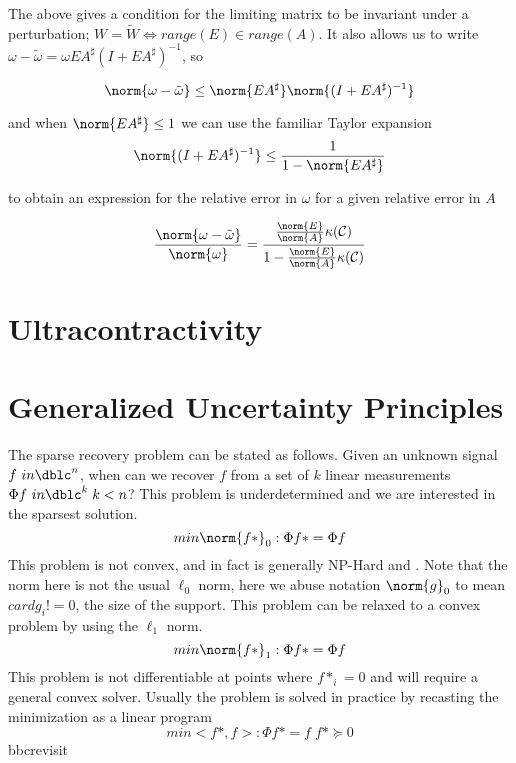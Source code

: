 The above gives a condition for the limiting matrix to be invariant under a perturbation;  $W=\tilde{W} \iff range(E) \in range(A)$.  It also allows us to write $\omega - \tilde{\omega} = \omega E A^\sharp (I+ E A^\sharp)^{-1}$, so

\begin{equation*}
\norm{\omega - \tilde{\omega}} \leq \norm{E A^\sharp} \norm{ (I+E A^\sharp)^{-1}}
\end{equation*}

and when $\norm{E A^\sharp} \leq 1$ we can use the familiar Taylor expansion
\begin{equation*}
\norm{(I+E A^\sharp)^{-1}} \leq \frac{1}{ 1 - \norm{E A^\sharp } }
\end{equation*}

to obtain an expression for the relative error in $\omega$ for a given relative error in $A$

\begin{equation*}
\frac{\norm{\omega - \tilde{\omega}}}{\norm{\omega}} = \frac{ \frac{\norm{E}}{\norm{A}} \kappa(\mathcal{C}) } {1 - \frac{\norm{E}}{\norm{A}} \kappa(\mathcal{C}) }
\end{equation*}



\section*{Ultracontractivity}


\section*{Generalized Uncertainty Principles}
The sparse recovery problem can be stated as follows.  Given an unknown signal $f \ in \dblc^n$, when can we recover $f$ from a set of $k$ linear measurements $\Phi f \ in \dblc^k \; k<n$? This problem is underdetermined and we are interested in the sparsest solution.
\begin{equation*}
min \norm{f*}_0 : \Phi f* = \Phi f
\end{equation*}
This problem is not convex, and in fact is generally NP-Hard \cite{Donoho04formost} and \cite{natarajan1995sparse}.  Note that the norm here is not the usual $\ell_0$ norm, here we abuse notation $\norm{g}_0$ to mean $card{g_i ! = 0}$, the size of the support. This problem can be relaxed to a convex problem by using the $\ell_1$ norm.
\begin{equation*}
min \norm{f*}_1 : \Phi f* = \Phi f
\end{equation*}
This problem is not differentiable at points where $f*_i=0$ and will require a general convex solver.  Usually the problem is solved in practice by recasting the minimization as a linear program
\begin{equation*}
min <f*,f> : \Phi f* = f \;  f* \succeq 0
\end{equation*}
bbcrevisit

